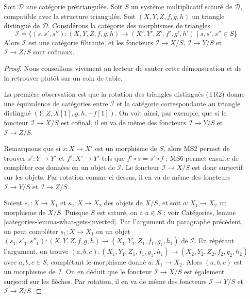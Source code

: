 \begin{lemma}
\label{lemma-limit-triangles}
Soit $\mathcal{D}$ une catégorie prétriangulée.
Soit $S$ un système multiplicatif saturé de $\mathcal{D}$, compatible avec la
structure triangulée.
Soit $(X, Y, Z, f, g, h)$ un triangle distingué de $\mathcal{D}$.
Considérons la catégorie des morphismes de triangles
$$
\mathcal{I} =
\{(s, s', s'') : (X, Y, Z, f, g, h) \to (X', Y', Z', f', g', h')
\mid s, s', s'' \in S\}
$$
Alors $\mathcal{I}$ est une catégorie filtrante, et les foncteurs
$\mathcal{I} \to X/S$, $\mathcal{I} \to Y/S$ et $\mathcal{I} \to Z/S$ sont
cofinaux.
\end{lemma}

\begin{proof}
Nous conseillons vivement au lecteur de sauter cette démonstration et de la
retrouver plutôt sur un coin de table.

\medskip\noindent
La première observation est que la rotation des triangles distingués (TR2)
donne une équivalence de catégories entre $\mathcal{I}$ et la catégorie
correspondante au triangle distingué $(Y, Z, X[1], g, h, -f[1])$.
On voit ainsi, par exemple, que si le foncteur $\mathcal{I} \to X/S$ est
cofinal, il en va de même des foncteurs $\mathcal{I} \to Y/S$ et
$\mathcal{I} \to Z/S$.

\medskip\noindent
Remarquons que si $s : X \to X'$ est un morphisme de $S$, alors MS2 permet de
trouver $s' : Y \to Y'$ et $f' : X' \to Y'$ tels que
$f' \circ s = s' \circ f$ ; MS6 permet ensuite de compléter ces données en un
objet de $\mathcal{I}$. Le foncteur $\mathcal{I} \to X/S$ est donc surjectif
sur les objets. Par rotation comme ci-dessus, il en va de même des foncteurs
$\mathcal{I} \to Y/S$ et $\mathcal{I} \to Z/S$.

\medskip\noindent
Soient $s_1 : X \to X_1 $ et $s_2 : X \to X_2$ des objets de $X/S$, et soit
$a : X_1 \to X_2$ un morphisme de $X/S$. Puisque $S$ est saturé, on a
$a \in S$ ; voir Catégories, lemme \ref{categories-lemma-what-gets-inverted}.
Par l'argument du paragraphe précédent, on peut compléter $s_1 : X \to X_1$ en
un objet
$(s_1, s'_1, s''_1) : (X, Y, Z, f, g, h) \to (X_1, Y_1, Z_1, f_1, g_1, h_1)$
de $\mathcal{I}$. En répétant l'argument, on trouve
$(a, b, c) : (X_1, Y_1, Z_1, f_1, g_1, h_1) \to (X_2, Y_2, Z_2, f_2, g_2, h_2)$
avec $a, b, c \in S$, complétant le morphisme donné $a : X_1 \to X_2$.
Alors $(a, b, c)$ est un morphisme de $\mathcal{I}$.
On en déduit que le foncteur $\mathcal{I} \to X/S$ est également surjectif sur
les flèches. Par rotation, il en va de même des foncteurs
$\mathcal{I} \to Y/S$ et $\mathcal{I} \to Z/S$.


\end{proof}
